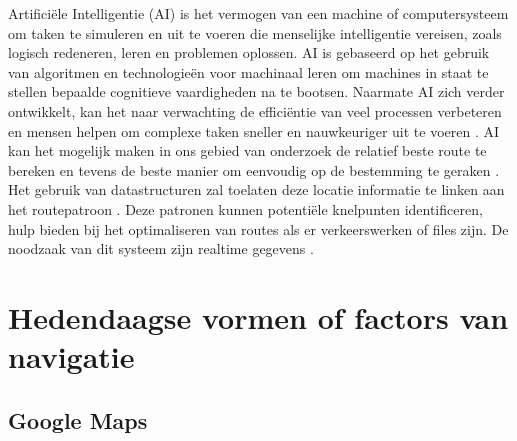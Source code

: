 Artificiële Intelligentie (AI) is het vermogen van een machine of computersysteem om taken te simuleren en uit te voeren die menselijke intelligentie vereisen, zoals logisch redeneren, leren en problemen oplossen. AI is gebaseerd op het gebruik van algoritmen en technologieën voor machinaal leren om machines in staat te stellen bepaalde cognitieve vaardigheden na te bootsen. Naarmate AI zich verder ontwikkelt, kan het naar verwachting de efficiëntie van veel processen verbeteren en mensen helpen om complexe taken sneller en nauwkeuriger uit te voeren \autocite{Sabouret2020}. AI kan het mogelijk maken in ons gebied van onderzoek de relatief beste route te bereken en tevens de beste manier om eenvoudig op de bestemming te geraken \autocite{Soni2023a}. Het gebruik van datastructuren zal toelaten deze locatie informatie te linken aan het routepatroon \autocite{Ruta2010}. Deze patronen kunnen potentiële knelpunten identificeren, hulp bieden bij het optimaliseren van routes als er verkeerswerken of files zijn. De noodzaak van dit systeem zijn realtime gegevens \autocite{Ciravegna2018}.


\section{Hedendaagse vormen of factors van navigatie}
\label{sec:literatuuroverzicht}


\subsection{Google Maps}
\label{sec:google-maps}


